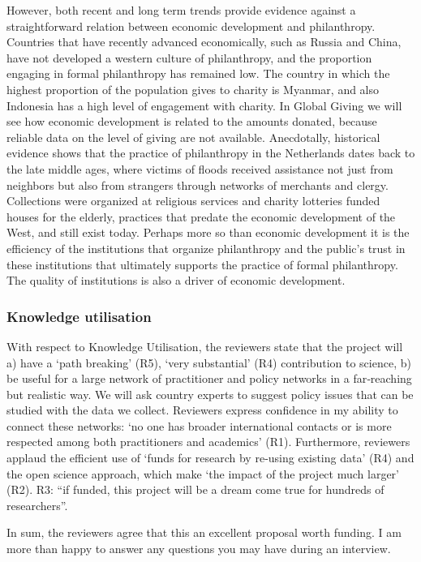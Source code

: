 \documentclass[twocolumn, serif, rga, numeric]{jote-article}
\begin{document}
However, both recent and long term trends provide evidence against a straightforward relation between economic development and philanthropy. Countries that have recently advanced economically, such as Russia and China, have not developed a western culture of philanthropy, and the proportion engaging in formal philanthropy has remained low. The country in which the highest proportion of the population gives to charity is Myanmar, and also Indonesia has a high level of engagement with charity. In Global Giving we will see how economic development is related to the amounts donated, because reliable data on the level of giving are not available. Anecdotally, historical evidence shows that the practice of philanthropy in the Netherlands dates back to the late middle ages, where victims of floods received assistance not just from neighbors but also from strangers through networks of merchants and clergy. Collections were organized at religious services and charity lotteries funded houses for the elderly, practices that predate the economic development of the West, and still exist today. Perhaps more so than economic development it is the efficiency of the institutions that organize philanthropy and the public’s trust in these institutions that ultimately supports the practice of formal philanthropy. The quality of institutions is also a driver of economic development.
 {}\subsubsection*{Knowledge utilisation} 
With respect to Knowledge Utilisation, the reviewers state that the project will a) have a ‘path breaking’ (R5), ‘very substantial’ (R4) contribution to science, b) be useful for a large network of practitioner and policy networks in a far‐reaching but realistic way. We will ask country experts to suggest policy issues that can be studied with the data we collect. Reviewers express confidence in my ability to connect these networks: ‘no one has broader international contacts or is more respected among both practitioners and academics’ (R1). Furthermore, reviewers applaud the efficient use of ‘funds for research by re‐using existing data’ (R4) and the open science approach, which make ‘the impact of the project much larger’ (R2). R3: “if funded, this project will be a dream come true for hundreds of researchers”.

In sum, the reviewers agree that this an excellent proposal worth funding. I am more than happy to answer any questions you may have during an interview.
\end{document}
